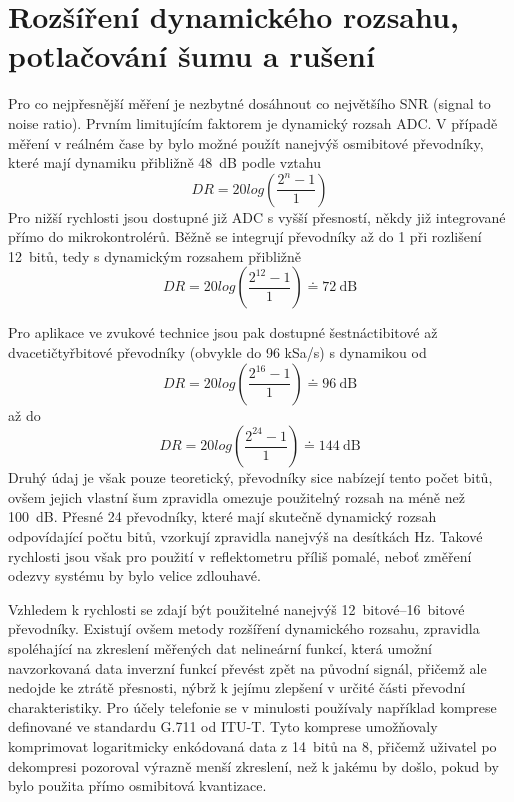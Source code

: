 \chapter{Rozšíření dynamického rozsahu, potlačování šumu a rušení}
Pro co nejpřesnější měření je nezbytné dosáhnout co největšího SNR (signal to noise ratio). Prvním limitujícím faktorem je dynamický rozsah ADC. V případě měření v reálném čase by bylo možné použít nanejvýš osmibitové převodníky, které mají dynamiku přibližně \SI{48}{\deci\bel} podle vztahu
\begin{equation}
	 DR=20log\left(\frac{2^n-1}{1}\right)
\end{equation}
Pro nižší rychlosti jsou dostupné již ADC s vyšší přesností, někdy již integrované přímo do mikrokontrolérů. Běžně se integrují převodníky až do \SI{1}{\megasample} při rozlišení 12~bitů, tedy s dynamickým rozsahem přibližně
\begin{equation}
	DR=20log\left(\frac{2^{12}-1}{1}\right) \doteq \SI{72}{\deci\bel}
\end{equation}

Pro aplikace ve zvukové technice jsou pak dostupné šestnáctibitové až dvacetičtyřbitové převodníky (obvykle do 96 kSa/s) s dynamikou od 
\begin{equation}
	DR=20log\left(\frac{2^{16}-1}{1}\right) \doteq \SI{96}{\deci\bel}
\end{equation} až do
\begin{equation}
	DR=20log\left(\frac{2^{24}-1}{1}\right) \doteq \SI{144}{\deci\bel}
\end{equation}
 Druhý údaj je však pouze teoretický, převodníky sice nabízejí tento počet bitů, ovšem jejich vlastní šum zpravidla omezuje použitelný rozsah na méně než \SI{100}{\deci\bel}. Přesné \SI{24}{\bit} převodníky, které mají skutečně dynamický rozsah odpovídající počtu bitů, vzorkují zpravidla nanejvýš na desítkách \si{\hertz}. Takové rychlosti jsou však pro použití v reflektometru příliš pomalé, neboť změření odezvy systému by bylo velice zdlouhavé.

Vzhledem k rychlosti se zdají být použitelné nanejvýš \SIrange{12}{16}{bitové} převodníky. Existují ovšem metody rozšíření dynamického rozsahu, zpravidla spoléhající na zkreslení měřených dat nelineární funkcí, která umožní navzorkovaná data inverzní funkcí převést zpět na původní signál, přičemž ale nedojde ke ztrátě přesnosti, nýbrž k jejímu zlepšení v určité části převodní charakteristiky. Pro účely telefonie se v minulosti používaly například komprese definované ve standardu G.711 od ITU-T. Tyto komprese umožňovaly komprimovat logaritmicky enkódovaná data z 14~bitů na 8, přičemž uživatel po dekompresi pozoroval výrazně menší zkreslení, než k jakému by došlo, pokud by bylo použita přímo osmibitová kvantizace.

